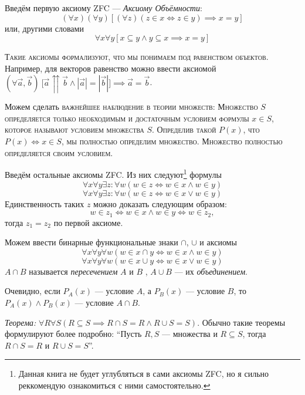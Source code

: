 Введём первую аксиому ZFC --- {\it Аксиому Объёмности}:
\begin{equation}\label{eq:ax_ext_1}
	(\forall x)(\forall y)[(\forall z)(z\in x\iff z\in y)\implies x=y]
\end{equation}
или, другими словами
\begin{equation}\label{eq:ax_ext_2}
	\forall x\forall y[x\subseteq y\land y\subseteq x\implies x=y]
\end{equation}

\textsc{Такие аксиомы формализуют, что мы понимаем под равенством объектов.}
Например, для векторов равенство можно ввести аксиомой
$(\forall \vec{a},\vec{b})~
	\big[\vec{a}\upuparrows\vec{b}\land|\vec{a}|=|\vec{b}|\big]
	\implies \vec{a}=\vec{b}$.

Можем сделать \textsc{важнейшее наблюдение в теории множеств: Множество $S$
	определяется только необходимым и достаточным условием формулы $x\in S$,
	которое называют условием множества $S$.
	Определив такой $P(x)$, что $P(x)\iff x\in S$, мы полностью определим множество.
	Множество полностью определяется своим условием.}

Введём остальные аксиомы ZFC. Из них следуют\footnote{
	Данная книга не будет углубляться в сами аксиомы ZFC, но я сильно реккомендую
	ознакомиться с ними самостоятельно.}
формулы
\[
	\forall x\forall y\exists z:\forall w(w\in z\iff w\in x\land w\in y)
\]
\[
	\forall x\forall y\exists z:\forall w(w\in z\iff w\in x\lor w\in y)
\]
Единственность таких $z$ можно доказать следующим образом:
\[
	w\in z_1\iff w\in x\land w\in y\iff w\in z_2,
\]
тогда $z_1=z_2$ по первой аксиоме.

Можем ввести бинарные функциональные знаки $\cap$, $\cup$ и аксиомы
\[
	\forall x\forall y\forall w(w\in x\cap y\iff w\in x\land w\in y)
\]
\[
	\forall x\forall y\forall w(w\in x\cup y\iff w\in x\lor w\in y)
\]
$A\cap B$ называется {\it пересечением} $A$ и $B$
,
$A\cup B$ --- их {\it объединением}.

Очевидно, если $P_{A}(x)$ --- условие $A$, а $P_{B}(x)$ --- условие $B$,
то $P_{A}(x)\land P_{B}(x)$ --- условие $A\cap B$.

\vspace{1em}
{\it Теорема:} ${\forall R\forall S(R\subseteq S\implies R\cap S=R\land R\cup S=S)}$.
Обычно такие теоремы формулируют более подробно:
``Пусть $R,S$ --- множества и $R\subseteq S$, тогда $R\cap S=R$ и $R\cup S=S$''.

